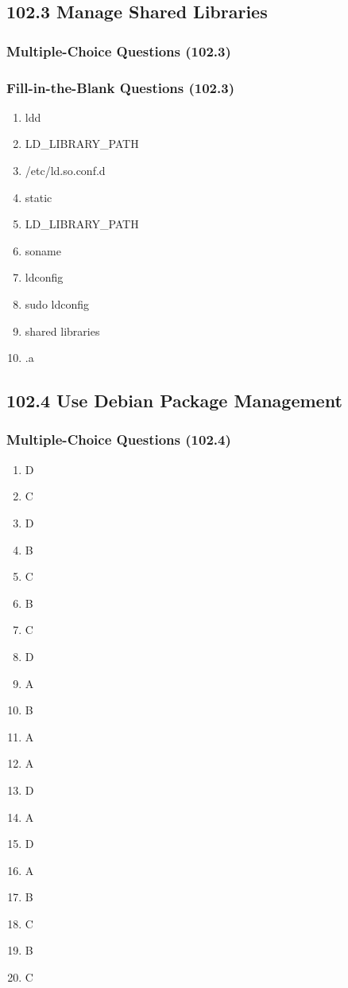 \documentclass[a4paper]{report}
\begin{document}
\subsection*{102.3 Manage Shared Libraries}
\subsubsection*{Multiple-Choice Questions (102.3)}

\subsubsection*{Fill-in-the-Blank Questions (102.3)}
\begin{enumerate}[1.]

    \item ldd
    \item LD\_LIBRARY\_PATH
    \item /etc/ld.so.conf.d
    \item static
    \item LD\_LIBRARY\_PATH
    \item soname
    \item ldconfig
    \item sudo ldconfig
    \item shared libraries
    \item .a
\end{enumerate}



\subsection*{102.4 Use Debian Package Management}
\subsubsection*{Multiple-Choice Questions (102.4)}
\begin{enumerate}[1.]
    \item D
    \item C
    \item D
    \item B
    \item C
    \item B
    \item C
    \item D
    \item A
    \item B
    \item A
    \item A
    \item D
    \item A
    \item D
    \item A
    \item B
    \item C
    \item B
    \item C
\end{enumerate}
\end{document}
